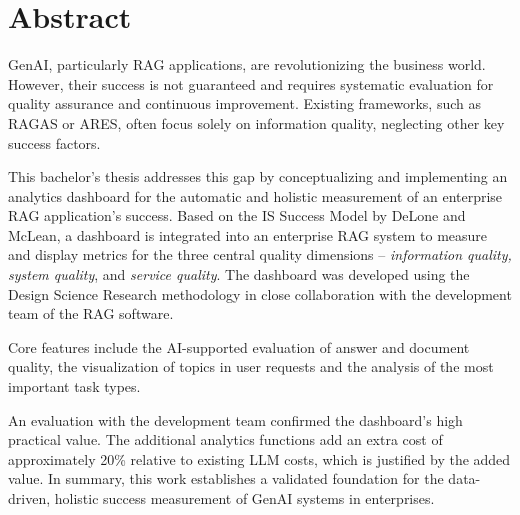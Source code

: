 \documentclass[
	english,
	ruledheaders=section,%
	class=report,%
	thesis={type=bachelor},%
	accentcolor=1b,%
	custommargins=true,%
	marginpar=false,%
	parskip=half-,%
	fontsize=11pt,%
	DIV=14,
]{tudapub}
\begin{document}
\chapter*{Abstract}

GenAI, particularly RAG applications, are revolutionizing the business world. However, their success is not guaranteed and requires systematic evaluation for quality assurance and continuous improvement. Existing frameworks, such as RAGAS or ARES, often focus solely on information quality, neglecting other key success factors.

This bachelor's thesis addresses this gap by conceptualizing and implementing an analytics dashboard for the automatic and holistic measurement of an enterprise RAG application's success. Based on the IS Success Model by DeLone and McLean, a dashboard is integrated into an enterprise RAG system to measure and display metrics for the three central quality dimensions – \textit{information quality, system quality}, and \textit{service quality}. The dashboard was developed using the Design Science Research methodology in close collaboration with the development team of the RAG software.

Core features include the AI-supported evaluation of answer and document quality, the visualization of topics in user requests and the analysis of the most important task types.

An evaluation with the development team confirmed the dashboard's high practical value. The additional analytics functions add an extra cost of approximately 20\% relative to existing LLM costs, which is justified by the added value. In summary, this work establishes a validated foundation for the data-driven, holistic success measurement of GenAI systems in enterprises.
\tableofcontents




\listoffigures
{}           %
\end{document}
